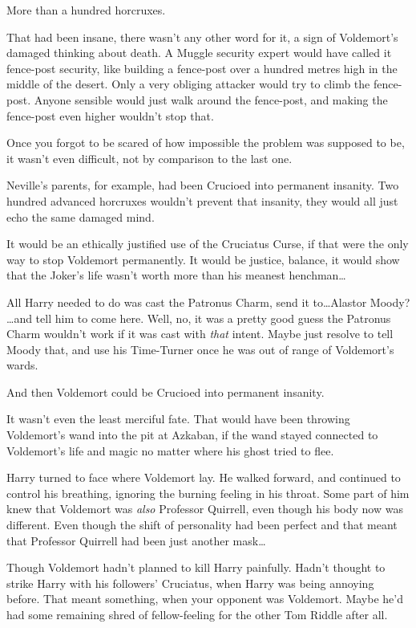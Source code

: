 More than a hundred horcruxes.

That had been insane, there wasn't any other word for it, a sign of Voldemort's damaged thinking about death. A Muggle security expert would have called it fence-post security, like building a fence-post over a hundred metres high in the middle of the desert. Only a very obliging attacker would try to climb the fence-post. Anyone sensible would just walk around the fence-post, and making the fence-post even higher wouldn't stop that.

Once you forgot to be scared of how impossible the problem was supposed to be, it wasn't even difficult, not by comparison to the last one.

Neville's parents, for example, had been Crucioed into permanent insanity. Two hundred advanced horcruxes wouldn't prevent that insanity, they would all just echo the same damaged mind.

It would be an ethically justified use of the Cruciatus Curse, if that were the only way to stop Voldemort permanently. It would be justice, balance, it would show that the Joker's life wasn't worth more than his meanest henchman…

All Harry needed to do was cast the Patronus Charm, send it to…Alastor Moody? …and tell him to come here. Well, no, it was a pretty good guess the Patronus Charm wouldn't work if it was cast with \emph{that} intent. Maybe just resolve to tell Moody that, and use his Time-Turner once he was out of range of Voldemort's wards.

And then Voldemort could be Crucioed into permanent insanity.

It wasn't even the least merciful fate. That would have been throwing Voldemort's wand into the pit at Azkaban, if the wand stayed connected to Voldemort's life and magic no matter where his ghost tried to flee.

Harry turned to face where Voldemort lay. He walked forward, and continued to control his breathing, ignoring the burning feeling in his throat. Some part of him knew that Voldemort was \emph{also} Professor Quirrell, even though his body now was different. Even though the shift of personality had been perfect and that meant that Professor Quirrell had been just another mask…

Though Voldemort hadn't planned to kill Harry painfully. Hadn't thought to strike Harry with his followers' Cruciatus, when Harry was being annoying before. That meant something, when your opponent was Voldemort. Maybe he'd had some remaining shred of fellow-feeling for the other Tom Riddle after all.

